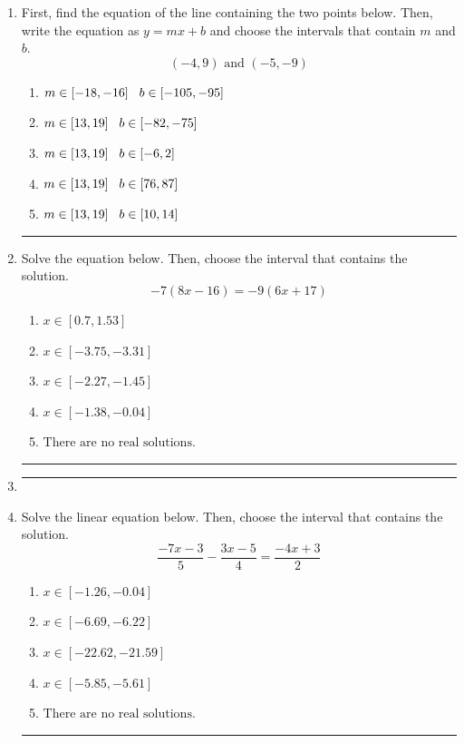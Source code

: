 \documentclass[14pt]{extbook}
\newcommand{\litem}[1]{\item#1\hspace*{-1cm}\rule{\textwidth}{0.4pt}}
\begin{document}
\begin{enumerate}
{\begin{enumerate}[label=\Alph*.]
\end{enumerate} }
\litem{
First, find the equation of the line containing the two points below. Then, write the equation as $ y=mx+b $ and choose the intervals that contain $m$ and $b$.\[ (-4, 9) \text{ and } (-5, -9) \]\begin{enumerate}[label=\Alph*.]
\item \( m \in [-18, -16] \hspace*{3mm} b \in [-105, -95] \)
\item \( m \in [13, 19] \hspace*{3mm} b \in [-82, -75] \)
\item \( m \in [13, 19] \hspace*{3mm} b \in [-6, 2] \)
\item \( m \in [13, 19] \hspace*{3mm} b \in [76, 87] \)
\item \( m \in [13, 19] \hspace*{3mm} b \in [10, 14] \)

\end{enumerate} }
\litem{
Solve the equation below. Then, choose the interval that contains the solution.\[ -7(8x -16) = -9(6x + 17) \]\begin{enumerate}[label=\Alph*.]
\item \( x \in [0.7, 1.53] \)
\item \( x \in [-3.75, -3.31] \)
\item \( x \in [-2.27, -1.45] \)
\item \( x \in [-1.38, -0.04] \)
\item \( \text{There are no real solutions.} \)

\end{enumerate} }
\litem{
\begin{enumerate}[label=\Alph*.]

\end{enumerate} }
\litem{
Solve the linear equation below. Then, choose the interval that contains the solution.\[ \frac{-7x -3}{5} - \frac{3x -5}{4} = \frac{-4x + 3}{2} \]\begin{enumerate}[label=\Alph*.]
\item \( x \in [-1.26, -0.04] \)
\item \( x \in [-6.69, -6.22] \)
\item \( x \in [-22.62, -21.59] \)
\item \( x \in [-5.85, -5.61] \)
\item \( \text{There are no real solutions.} \)

\end{enumerate} }
\end{enumerate}
\end{document}
